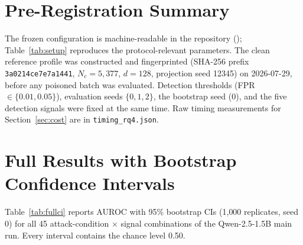 \documentclass[runningheads]{llncs}
\begin{document}
\section{Pre-Registration Summary}\label{app:prereg}

The frozen configuration is machine-readable in the repository
(); Table~\ref{tab:setup}
reproduces the protocol-relevant parameters. The clean reference profile was
constructed and fingerprinted (SHA-256 prefix \texttt{3a0214ce7e7a1441},
$N_c = 5{,}377$, $d = 128$, projection seed 12345) on 2026-07-29, before any
poisoned batch was evaluated. Detection thresholds (FPR
$\in \{0.01, 0.05\}$), evaluation seeds $\{0, 1, 2\}$, the bootstrap seed (0),
and the five detection signals were fixed at the same time. Raw timing
measurements for Section~\ref{sec:cost} are in \texttt{timing\_rq4.json}.

\section{Full Results with Bootstrap Confidence Intervals}\label{app:fullresults}

Table~\ref{tab:fullci} reports AUROC with 95\% bootstrap CIs (1{,}000
replicates, seed 0) for all 45 attack-condition $\times$ signal combinations
of the Qwen-2.5-1.5B main run. Every interval contains the chance level 0.50.
\end{document}

